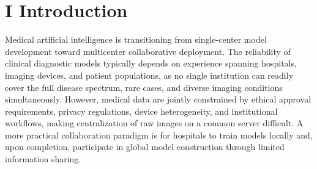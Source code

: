 \documentclass[letterpaper]{article} %
\begin{document}
\section{I Introduction}

Medical artificial intelligence is transitioning from single-center model development toward multicenter collaborative deployment. The reliability of clinical diagnostic models typically depends on experience spanning hospitals, imaging devices, and patient populations, as no single institution can readily cover the full disease spectrum, rare cases, and diverse imaging conditions simultaneously. However, medical data are jointly constrained by ethical approval requirements, privacy regulations, device heterogeneity, and institutional workflows, making centralization of raw images on a common server difficult. A more practical collaboration paradigm is for hospitals to train models locally and, upon completion, participate in global model construction through limited information sharing.
\end{document}
